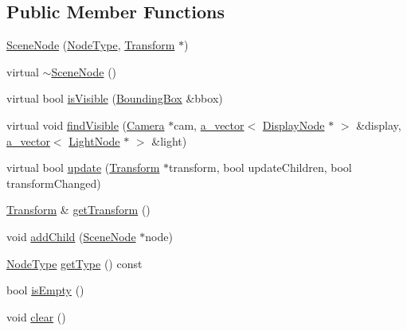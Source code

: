 \subsection*{Public Member Functions}
\begin{DoxyCompactItemize}
\item 
\hyperlink{class_agmd_1_1_scene_node_a1c1f053d797d8e8a6ba88ce5a83255ed}{Scene\+Node} (\hyperlink{namespace_agmd_aab017255de32f494c1e7330b4ad7e945}{Node\+Type}, \hyperlink{class_agmd_maths_1_1_transform}{Transform} $\ast$)
\item 
virtual \hyperlink{class_agmd_1_1_scene_node_a10621f9021041f93f137e7c1edd2a8bb}{$\sim$\+Scene\+Node} ()
\item 
virtual bool \hyperlink{class_agmd_1_1_scene_node_ae523c967aa9d24bc8b66db43e84f0c5f}{is\+Visible} (\hyperlink{class_agmd_1_1_bounding_box}{Bounding\+Box} \&bbox)
\item 
virtual void \hyperlink{class_agmd_1_1_scene_node_a7cae5ee1b73f40e074f4ac86be4b694a}{find\+Visible} (\hyperlink{class_agmd_1_1_camera}{Camera} $\ast$cam, \hyperlink{_vector_8h_a3df82cea60ff4ad0acb44e58454406a5}{a\+\_\+vector}$<$ \hyperlink{class_agmd_1_1_display_node}{Display\+Node} $\ast$ $>$ \&display, \hyperlink{_vector_8h_a3df82cea60ff4ad0acb44e58454406a5}{a\+\_\+vector}$<$ \hyperlink{class_agmd_1_1_light_node}{Light\+Node} $\ast$ $>$ \&light)
\item 
virtual bool \hyperlink{class_agmd_1_1_scene_node_a8ee2002fe5b30368f272d31ce0213d2e}{update} (\hyperlink{class_agmd_maths_1_1_transform}{Transform} $\ast$transform, bool update\+Children, bool transform\+Changed)
\item 
\hyperlink{class_agmd_maths_1_1_transform}{Transform} \& \hyperlink{class_agmd_1_1_scene_node_ab45325e60dec6187293000b3d3e5bbef}{get\+Transform} ()
\item 
void \hyperlink{class_agmd_1_1_scene_node_a018339cbc213ce125319ddc996671efd}{add\+Child} (\hyperlink{class_agmd_1_1_scene_node}{Scene\+Node} $\ast$node)
\item 
\hyperlink{namespace_agmd_aab017255de32f494c1e7330b4ad7e945}{Node\+Type} \hyperlink{class_agmd_1_1_scene_node_aa239f52109ebd0ab1678038ab549ee71}{get\+Type} () const 
\item 
bool \hyperlink{class_agmd_1_1_scene_node_a424dd9ef137707cd9ec54bd05a72a31d}{is\+Empty} ()
\item 
void \hyperlink{class_agmd_1_1_scene_node_a8f81da4424e248ccfa3896247aa27883}{clear} ()
\end{DoxyCompactItemize}

